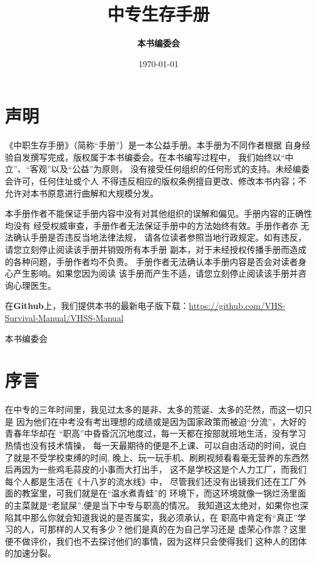 \documentclass{article}
\begin{document}
\title{\textbf{中专生存手册}}
\author{\textbf{本书编委会}}
\date{\today{}}

\maketitle
\thispagestyle{empty}
\newpage

\section{声明}

《中职生存手册》（简称“手册”）是一本公益手册。本手册为不同作者根据
自身经验自发撰写完成，版权属于本书编委会。在本书编写过程中，
我们始终以“中立”、“客观”以及“公益”为原则，
没有接受任何组织的任何形式的支持。未经编委会许可，任何住址或个人
不得违反相应的版权条例擅自更改、修改本书内容；不允许对本书原意进行曲解和大规模分发。

本手册作者不能保证手册内容中没有对其他组织的误解和偏见。手册内容的正确性均没有
经受权威审查，手册作者无法保证手册中的方法始终有效。手册作者亦
无法确认手册是否违反当地法律法规，
请各位读者参照当地行政规定。如有违反，请您立刻停止阅读该手册并销毁所有本手册
副本，对于未经授权传播手册而造成的各种问题，手册作者均不负责。
手册作者无法确认本手册内容是否会对读者身心产生影响。如果您因为阅读
该手册而产生不适，请您立刻停止阅读该手册并咨询心理医生。

在\textbf{Github}上，我们提供本书的最新电子版下载：\href{VHSS-Manual}{https://github.com/VHS-Survival-Manual/VHSS-Manual}

\begin{flushright}
本书编委会
\end{flushright}
\newpage

\section{序言}

在中专的三年时间里，我见过太多的是非、太多的荒诞、太多的茫然，而这一切只是
因为他们在中考没有考出理想的成绩或是因为国家政策而被迫“分流”，大好的青春年华却在
“职高”中昏昏沉沉地度过，每一天都在按部就班地生活，没有学习热情也没有技术情操，
每一天最期待的便是不上课、可以自由活动的时间，说白了就是不受学校束缚的时间,
晚上、玩一玩手机、刷刷视频看看毫无营养的东西然后再因为一些鸡毛蒜皮的小事而大打出手，
这不是学校这是个人力工厂，而我们每个人都是生活在《十八岁的流水线》中，
尽管我们还没有出镜我们还在工厂外面的教室里，可我们就是在“温水煮青蛙”的
环境下，而这环境就像一锅烂汤里面的主菜就是“老鼠屎”,便是当下中专与职高的情况。
我知道这太绝对，如果你也深陷其中那么你就会知道我说的是否属实，我必须承认，在
职高中肯定有“真正”学习的人，可那样的人又有多少？他们是真的在为自己学习还是
虚荣心作祟？这里便不做评价，我们也不去探讨他们的事情，因为这样只会使得我们
这种人的团体的加速分裂。
\end{document}
